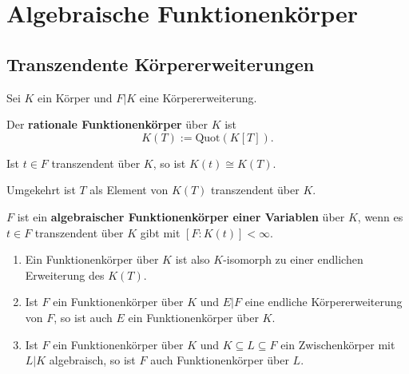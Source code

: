 
\chapter{Algebraische Funktionenkörper}
\section{Transzendente Körpererweiterungen}
Sei $K$ ein Körper und $F|K$ eine Körpererweiterung.

\begin{definition}
    Der \textbf{rationale Funktionenkörper} über $K$ ist
    $$ K(T) := \text{Quot}(K[T]). $$
\end{definition}

\begin{bemerkungnr}
    Ist $t \in F$ transzendent über $K$, so ist $K(t) \cong K(T)$.
    
    Umgekehrt ist $T$ als Element von $K(T)$ transzendent über $K$.
\end{bemerkungnr}

\begin{definition}
    $F$ ist ein \textbf{algebraischer Funktionenkörper einer Variablen} über $K$, 
    wenn es $t \in F$ transzendent über $K$ gibt mit $[F:K(t)] < \infty$.
\end{definition}

\begin{bemerkungnr}
    \begin{enumerate}[label=\alph*)]
        \item Ein Funktionenkörper über $K$ ist also $K$-isomorph zu einer endlichen Erweiterung des $K(T)$.
        
        \item Ist $F$ ein Funktionenkörper über $K$ und $E|F$ eine endliche Körpererweiterung von $F$, 
        so ist auch $E$ ein Funktionenkörper über $K$.

        \item Ist $F$ ein Funktionenkörper über $K$ und $K \subseteq L \subseteq F$ ein Zwischenkörper mit 
        $L|K$ algebraisch, so ist $F$ auch Funktionenkörper über $L$.
    \end{enumerate}
\end{bemerkungnr}

